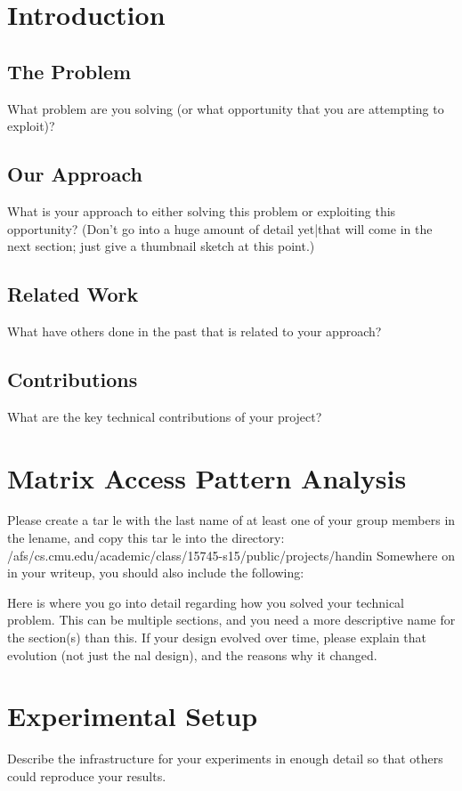 \documentclass[letterpaper]{article}
\begin{document}
\section{Introduction}

\subsection{The Problem}
What  problem  are  you  solving  (or  what  opportunity
that you are attempting to exploit)?

\subsection{Our Approach}
What is your approach to either solving this problem or exploiting
this opportunity?  (Don't go into a huge amount of detail yet|that will come in the
next section; just give a thumbnail sketch at this point.)

\subsection{Related Work}
What have others done in the past that is related to your approach?

\subsection{Contributions}
What are the key technical contributions of your project?

\section{Matrix Access Pattern Analysis}
Please create a tar le with the last name of at least one
of your group members in the lename, and copy this tar le into the directory:
/afs/cs.cmu.edu/academic/class/15745-s15/public/projects/handin
Somewhere on in your writeup, you should also include the following:

Here is where you go into detail regarding
how you solved your technical problem.  This can be multiple sections, and you need a more
descriptive name for the section(s) than this.  If your design evolved over time, please explain
that evolution (not just the nal design), and the reasons why it changed.

\section{Experimental Setup}
Describe the infrastructure for your experiments in enough detail so
that others could reproduce your results.
\end{document}

